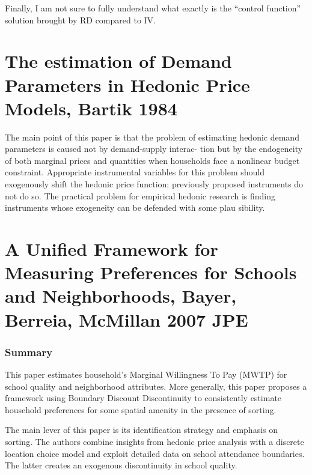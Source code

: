 \documentclass[12pt, final]{article}
\begin{document}
Finally, I am not sure to fully understand what exactly is the “control function” solution brought by RD compared to IV.



\newpage

\section*{The estimation of Demand Parameters in Hedonic Price Models, Bartik 1984} %
\label{sec:the_estimation_of_demand_parameters_in_hedonic_price_models_bartik_1984}

The main point of this paper is that the problem of estimating hedonic demand parameters is caused not by demand-supply interac- tion but by the endogeneity of both marginal prices and quantities when households face a nonlinear budget constraint. Appropriate instrumental variables for this problem should exogenously shift the hedonic price function; previously proposed instruments do not do so. The practical problem for empirical hedonic research is finding instruments whose exogeneity can be defended with some plau
sibility.

\newpage



\section*{A Unified Framework for Measuring Preferences for Schools and Neighborhoods, Bayer, Berreia, McMillan 2007 JPE} %
\label{sec:a_unified_framework_for_measuring_preferences_for_schools_and_neighborhoods_bayer_berreia_mcmillan_2007_jpe}

\subsubsection*{Summary} %
\label{ssub:summary}

This paper estimates household's Marginal Willingness To Pay (MWTP) for school quality and neighborhood attributes. 
More generally, this paper proposes a framework using Boundary Discount Discontinuity to consistently estimate household preferences for some spatial amenity in the presence of sorting.

The main lever of this paper is its identification strategy and emphasis on sorting. The authors combine insights from hedonic price analysis with a discrete location choice model and exploit detailed data on school attendance boundaries.
The latter creates an exogenous discontinuity in school quality.
\end{document}
